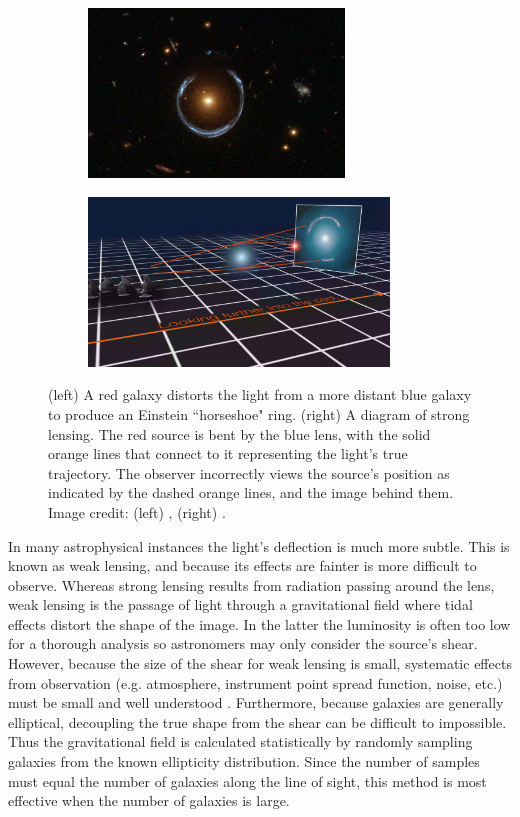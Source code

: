 \begin{figure}
 \centering
 \begin{subfigure}[t]{0.5\textwidth}
  \centering
  \includegraphics[trim={0cm, 2cm, 0cm, 0cm}, clip, height=4.5cm]{lensing_horseshoe}
 \end{subfigure}%
 \begin{subfigure}[t]{0.5\textwidth}
  \centering
  \includegraphics[trim={6cm, 0cm, 0cm, 0cm}, clip, height=4.5cm]{lensing_diagram}
 \end{subfigure}
 \caption{(left) A red galaxy distorts the light from a more distant blue galaxy to produce an Einstein ``horseshoe" ring.  (right)
 A diagram of strong lensing.  The red source is bent by the blue lens, with the solid orange lines that connect
 to it representing the light's true trajectory.  The observer incorrectly views the source's
 position as indicated by the dashed orange lines, and the image behind them.  Image credit: (left) , (right)
 .}
 \label{fig:lensing}
\end{figure}


In many astrophysical instances the light's deflection is much more subtle.  This is known as weak
lensing, and because its effects are fainter is more difficult to observe.  Whereas strong lensing results from radiation passing around
the lens, weak lensing is the passage of light through a gravitational field where tidal effects distort the shape of the image.  In the
latter the luminosity is often too low for a thorough analysis so
astronomers may only consider the source's shear.  However, because the size of the shear for weak lensing is small, systematic
effects from observation (e.g. atmosphere, instrument point spread function, noise, etc.) must be small and well
understood .  Furthermore,
because galaxies are generally elliptical, decoupling the true shape from the shear can be difficult to impossible.  Thus the
gravitational field is calculated statistically by randomly sampling galaxies from the known ellipticity distribution.  Since the
number of samples must equal the number of galaxies along the line of sight, this method is most effective when the number of galaxies is
large.

